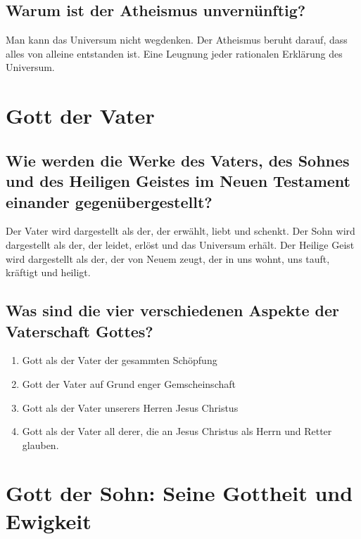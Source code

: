\subsection{Warum ist der Atheismus unvernünftig?}
Man kann das Universum nicht wegdenken. Der Atheismus beruht darauf, dass alles von alleine entstanden ist. Eine Leugnung jeder rationalen Erklärung des Universum.
\section{Gott der Vater}
\subsection{Wie werden die Werke des Vaters, des Sohnes und des Heiligen Geistes im Neuen Testament einander gegenübergestellt?}
Der Vater wird dargestellt als der, der erwählt, liebt und schenkt. Der Sohn wird dargestellt als der, der leidet, erlöst und das Universum erhält. Der Heilige Geist wird dargestellt als der, der von Neuem zeugt, der in uns wohnt, uns tauft, kräftigt und heiligt.
\subsection{Was sind die vier verschiedenen Aspekte der Vaterschaft Gottes?}
\begin{enumerate}
	\item Gott als der Vater der gesammten Schöpfung
	\item Gott der Vater auf Grund enger Gemscheinschaft
	\item Gott als der Vater unserers Herren Jesus Christus
	\item Gott als der Vater all derer, die an Jesus Christus als Herrn und Retter glauben.
\end{enumerate}
\section{Gott der Sohn: Seine Gottheit und Ewigkeit}